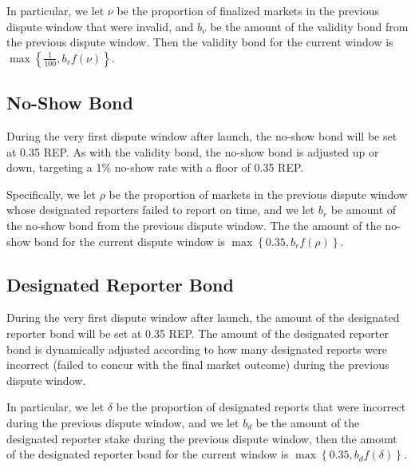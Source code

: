 \documentclass[floatfix,reprint,nofootinbib,amsmath,amssymb,epsfig,pre,floats,letterpaper,groupedaffiliation]{revtex4-1}
\theoremstyle{definition}
\theoremstyle{definition}
\begin{document}
\begin{appendix}
In particular, we let $\nu$ be the proportion of finalized markets in the previous dispute window that were invalid, and $b_v$ be the amount of the validity bond from the previous dispute window. Then the validity bond for the current window is $\max\left\{\frac{1}{100}, b_v f(\nu)\right\}$.

\subsection{No-Show Bond}\label{section:bond_size_adjustment_details_no-show_bonds}

During the very first dispute window after launch, the no-show bond will be set at 0.35 REP. As with the validity bond, the no-show bond is adjusted up or down, targeting a 1\% no-show rate with a floor of 0.35 REP.

Specifically, we let $\rho$ be the proportion of markets in the previous dispute window whose designated reporters failed to report on time, and we let $b_r$ be amount of the no-show bond from the previous dispute window. The the amount of the no-show bond for the current dispute window is $\max\left\{0.35,b_r f(\rho)\right\}$.

\subsection{Designated Reporter Bond}\label{section:bond_size_adjustment_details_designated_reporter_stake}

During the very first dispute window after launch, the amount of the designated reporter bond will be set at 0.35 REP. The amount of the designated reporter bond is dynamically adjusted according to how many designated reports were incorrect (failed to concur with the final market outcome) during the previous dispute window.

In particular, we let $\delta$ be the proportion of designated reports that were incorrect during the previous dispute window, and we let $b_d$ be the amount of the designated reporter stake during the previous dispute window, then the amount of the designated reporter bond for the current window is $\max\left\{0.35, b_d f(\delta)\right\}$.


\end{appendix}
\end{document}
